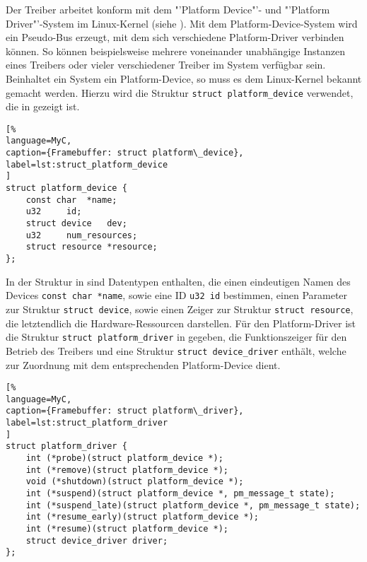 Der Treiber arbeitet konform mit dem "'Platform Device"'- und "'Platform Driver"'-System im Linux-Kernel (siehe \cite{LinuxKernelPlatformDeviceDriver}). Mit dem Platform-Device-System wird ein Pseudo-Bus erzeugt, mit dem sich verschiedene Platform-Driver verbinden können. So können beispielsweise mehrere voneinander unabhängige Instanzen eines Treibers oder vieler verschiedener Treiber im System verfügbar sein. Beinhaltet ein System ein Platform-Device, so muss es dem Linux-Kernel bekannt gemacht werden. Hierzu wird die Struktur \lstinline|struct platform_device| verwendet, die in  gezeigt ist.

\begin{lstlisting}[%
language=MyC,
caption={Framebuffer: struct platform\_device},
label=lst:struct_platform_device
]
struct platform_device {
	const char	*name;
	u32		id;
	struct device	dev;
	u32		num_resources;
	struct resource	*resource;
};
\end{lstlisting}

In der Struktur in  sind Datentypen enthalten, die einen eindeutigen Namen des Devices \lstinline|const char *name|, sowie eine ID \lstinline|u32 id|  bestimmen, einen Parameter zur Struktur \lstinline|struct device|, sowie einen Zeiger zur Struktur \lstinline|struct resource|, die letztendlich die Hardware-Ressourcen darstellen. Für den Platform-Driver ist die Struktur \lstinline|struct platform_driver| in  gegeben, die Funktionszeiger für den Betrieb des Treibers und eine Struktur \lstinline|struct device_driver| enthält, welche zur Zuordnung mit dem entsprechenden Platform-Device dient.
\begin{lstlisting}[%
language=MyC,
caption={Framebuffer: struct platform\_driver},
label=lst:struct_platform_driver
]
struct platform_driver {
	int (*probe)(struct platform_device *);
	int (*remove)(struct platform_device *);
	void (*shutdown)(struct platform_device *);
	int (*suspend)(struct platform_device *, pm_message_t state);
	int (*suspend_late)(struct platform_device *, pm_message_t state);
	int (*resume_early)(struct platform_device *);
	int (*resume)(struct platform_device *);
	struct device_driver driver;
};
\end{lstlisting}

